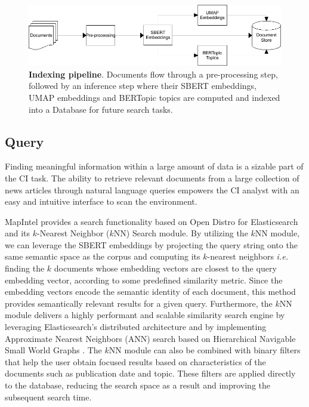 \documentclass[a4paper]{article}
\begin{document}
\begin{figure}[H]
	\centering
	\includegraphics[width=\linewidth]{./assets/indexing_pipeline}
	\caption{\textbf{Indexing pipeline}. Documents flow through a pre-processing step, followed by an inference step where their SBERT embeddings, UMAP embeddings and BERTopic topics are computed and indexed into a Database for future search tasks.}
	\label{indexing_pipeline}
\end{figure}

\subsection{Query} \label{query}
Finding meaningful information within a large amount of data is a sizable part of the CI task. The ability to retrieve relevant documents from a large collection of news articles through natural language queries empowers the CI analyst with an easy and intuitive interface to scan the environment.

MapIntel provides a search functionality based on Open Distro for Elasticsearch and its $k$-Nearest Neighbor ($k$NN) Search module. By utilizing the $k$NN module, we can leverage the SBERT embeddings by projecting the query string onto the same semantic space as the corpus and computing its $k$-nearest neighbors \textit{i.e.} finding the $k$ documents whose embedding vectors are closest to the query embedding vector, according to some predefined similarity metric. Since the embedding vectors encode the semantic identity of each document, this method provides semantically relevant results for a given query. Furthermore, the $k$NN module delivers a highly performant and scalable similarity search engine by leveraging Elasticsearch’s distributed architecture and by implementing Approximate Nearest Neighbors (ANN) search based on Hierarchical Navigable Small World Graphs \citep{malkov2018}. The $k$NN module can also be combined with binary filters that help the user obtain focused results based on characteristics of the documents such as publication date and topic. These filters are applied directly to the database, reducing the search space as a result and improving the subsequent search time.
\end{document}
